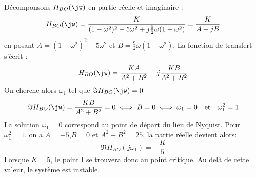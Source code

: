Décomponsons $H_{BO}(\jw)$ en partie réelle et imaginaire :
\[
H_{BO}(\jw)=
\dfrac{K}{(1-\omega^2)^2-5\omega^2+j\frac{9}{2}\omega(1-\omega^2)}
=\dfrac{K}{A+jB}
\]
en posant $A=(1-\omega^2)^2-5\omega^2$ et $B=\frac{9}{2}\omega(1-\omega^2)$.
La fonction de transfert s'écrit :
\[
H_{BO}(\jw)=\dfrac{KA}{A^2+B^2}-j\dfrac{KB}{A^2+B^2}
\]
On cherche alors $\omega_1$ tel que $\Im{H_{BO}(\jw)}=0$
\[
\Im{H_{BO}(\jw)}=\dfrac{KB}{A^2+B^2}=0 
\iff B=0\iff \omega_1=0\quad\text{et}\quad\omega_1^2=1
\]
La solution $\omega_1=0$ correspond au point de départ du lieu de Nyquist.
Pour $\omega_1^2=1$, on a $A=-5$,$B=0$ et $A^2+B^2=25$, 
la partie réelle devient alors:
\[
\Re{H_{BO}(j\omega_1)}=-\dfrac{K}{5}
\]
Lorsque $K=5$, le point I se trouvera donc au point critique. 
Au delà de cette valeur, le système est instable.
